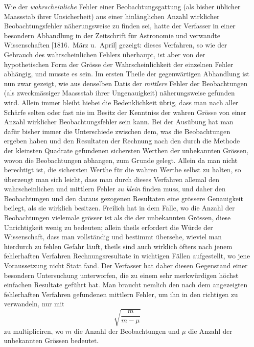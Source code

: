 \documentclass[12pt,a4paper]{article}
\begin{document}
Wie der \textit{wahrscheinliche} Fehler einer Beobachtungsgattung (als bisher \"ublicher Maassstab ihrer Unsicherheit) aus einer hinl\"anglichen Anzahl wirklicher Beobachtungsfehler n\"aherungsweise zu finden sei, hatte der Verfasser in einer besondern Abhandlung in der Zeitschrift f\"ur Astronomie und verwandte Wissenschaften [1816.\ M\"arz u.\ April] gezeigt: dieses Verfahren, so wie der Gebrauch des wahrscheinlichen Fehlers \"uberhaupt, ist aber von der hypothetischen Form der Gr\"osse der Wahrscheinlichkeit der einzelnen Fehler abh\"angig, und musste es sein. Im ersten Theile der gegenw\"artigen Abhandlung ist nun zwar gezeigt, wie aus denselben Datis der \textit{mittlere} Fehler der Beobachtungen (als zweckm\"assiger Maassstab ihrer Ungenauigkeit) n\"aherungsweise gefunden wird. Allein immer bleibt hiebei die Bedenklichkeit \"ubrig, dass man nach aller Sch\"arfe selten oder fast nie im Besitz der Kenntniss der wahren Gr\"osse von einer Anzahl wirklicher Beobachtungsfehler sein kann. Bei der Aus\"ubung hat man daf\"ur bisher immer die Unterschiede zwischen dem, was die Beobachtungen ergeben haben und den Resultaten der Rechnung nach den durch die Methode der kleinsten Quadrate gefundenen sichersten Werthen der unbekannten Gr\"ossen, wovon die Beobachtungen abhangen, zum Grunde gelegt. Allein da man nicht berechtigt ist, die sichersten Werthe f\"ur die wahren Werthe selbst zu halten, so \"uberzeugt man sich leicht, dass man durch dieses Verfahren allemal den wahrscheinlichen und mittlern Fehler \textit{zu klein} finden muss, und daher den Beobachtungen und den daraus gezogenen Resultaten eine gr\"ossere Genauigkeit beilegt, als sie wirklich besitzen. Freilich hat in dem Falle, wo die Anzahl der Beobachtungen vielemale gr\"osser ist als die der unbekannten Gr\"ossen, diese Unrichtigkeit wenig zu bedeuten; allein theils erfordert die W\"urde der Wissenschaft, dass man vollst\"andig und bestimmt \"ubersehe, wieviel man hierdurch zu fehlen Gefahr l\"auft, theils sind auch wirklich \"ofters nach jenem fehlerhaften Verfahren Rechnungsresultate in wichtigen F\"allen aufgestellt, wo jene Voraussetzung nicht Statt fand. Der Verfasser hat daher diesen Gegenstand einer besondern Untersuchung unterworfen, die zu einem sehr merkw\"urdigen h\"ochst einfachen Resultate gef\"uhrt hat. Man braucht nemlich den nach dem angezeigten fehlerhaften Verfahren gefundenen mittlern Fehler, um ihn in den richtigen zu verwandeln, nur mit
\[
\sqrt{\frac{m}{m-\mu}}
\]
zu multipliciren, wo $m$ die Anzahl der Beobachtungen und $\mu$ die Anzahl der unbekannten Gr\"ossen bedeutet.
\end{document}

